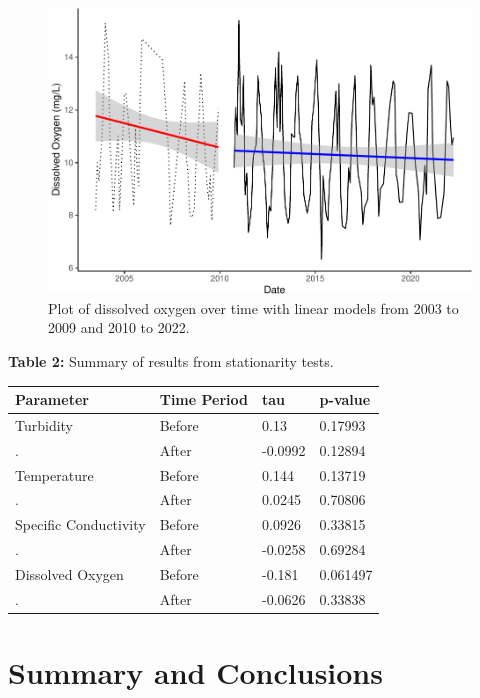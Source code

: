 \documentclass[
  12pt,
]{article}
\begin{document}
\newpage

\begin{figure}

{\centering \includegraphics{Project_Template_files/figure-latex/Plot of Dissolved Oxygen over time with LMs-1} 

}

\caption{Plot of dissolved oxygen over time with linear models from 2003 to 2009 and 2010 to 2022.}\label{fig:Plot of Dissolved Oxygen over time with LMs}
\end{figure}

\newpage

\textbf{Table 2:} Summary of results from stationarity tests.

\begin{longtable}[]{@{}llll@{}}
\toprule
Parameter & Time Period & tau & p-value \\
\midrule
\endhead
Turbidity & Before & 0.13 & 0.17993 \\
. & After & -0.0992 & 0.12894 \\
Temperature & Before & 0.144 & 0.13719 \\
. & After & 0.0245 & 0.70806 \\
Specific Conductivity & Before & 0.0926 & 0.33815 \\
. & After & -0.0258 & 0.69284 \\
Dissolved Oxygen & Before & -0.181 & 0.061497 \\
. & After & -0.0626 & 0.33838 \\
\bottomrule
\end{longtable}

\newpage

\hypertarget{summary-and-conclusions}{%
\section{Summary and Conclusions}\label{summary-and-conclusions}}
\end{document}
